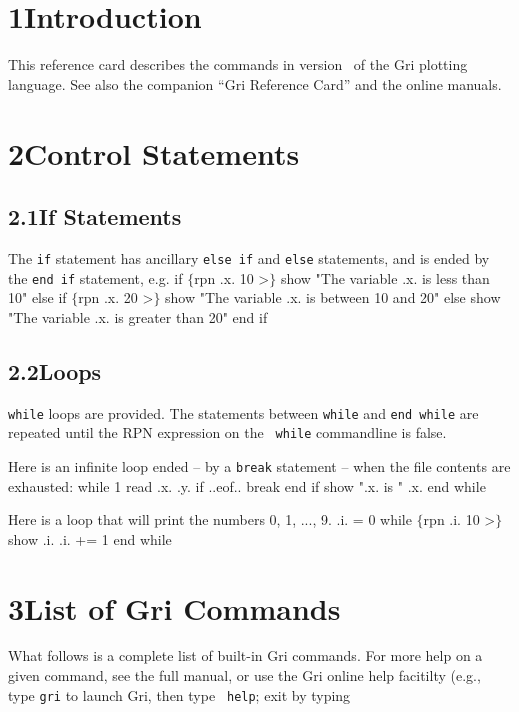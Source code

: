\section{1\quad Introduction}
This reference card describes the commands in version \griversion\ of
the Gri plotting language.  See also the companion ``Gri Reference
Card'' and the online manuals.

\section{2\quad Control Statements}

\subsection{2.1\quad If Statements}
The {\tt if} statement has ancillary {\tt else if} and {\tt else}
statements, and is ended by the {\tt end if} statement, e.g.
\beginexample
if $\lbrace$rpn .x. 10 >$\rbrace$
    show "The variable .x. is less than 10"
else if $\lbrace$rpn .x. 20 >$\rbrace$
    show "The variable .x. is between 10 and 20"
else
   show "The variable .x. is greater than 20"
end if
\endexample


\subsection{2.2\quad Loops}
{\tt while} loops are provided.  The statements between {\tt while}
and {\tt end while} are repeated until the RPN expression on the {\tt
while} commandline is false.

Here is an infinite loop ended -- by a {\tt break} statement -- when
the file contents are exhausted:
\beginexample
while 1
    read .x. .y.
    if ..eof..
        break
    end if
    show ".x. is " .x.
end while
\endexample

Here is a loop that will print the numbers 0, 1, ..., 9.
\beginexample
.i. = 0
while $\lbrace$rpn .i. 10 >$\rbrace$
    show .i.
    .i. += 1
end while
\endexample



\section{3\quad List of Gri Commands}

What follows is a complete list of built-in Gri commands.  For more
help on a given command, see the full manual, or use the Gri online
help facitilty (e.g., type {\tt gri} to launch Gri, then type {\tt
help}; exit by typing

